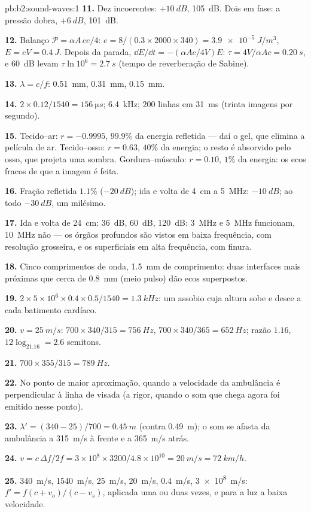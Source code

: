 \begin{solution}{pb:b2:sound-waves:1}
\textbf{11.} Dez incoerentes: $+\qty{10}{dB}$, \qty{105}{dB}. Dois em fase: a
pressão dobra, $+\qty{6}{dB}$, \qty{101}{dB}.

\textbf{12.} Balanço $\mathcal P = \alpha A\,ce/4$: $e = 8/(0.3 \times 2000 \times 340) =
\qty{3.9e-5}{J/m^3}$, $E = eV = \qty{0.4}{J}$. Depois da parada, $\dd E/\dd t = -(\alpha Ac
/4V)E$: $\tau = 4V/\alpha Ac = \qty{0.20}{s}$, e \qty{60}{dB} levam $\tau\ln10^6 =
\qty{2.7}{s}$ (tempo de reverberação de Sabine).

\textbf{13.} $\lambda = c/f$: \qty{0.51}{mm}, \qty{0.31}{mm}, \qty{0.15}{mm}.

\textbf{14.} $2 \times 0.12/1540 = \qty{156}{\micro s}$; \qty{6.4}{kHz}; $200$ linhas em
\qty{31}{ms} (trinta imagens por segundo).

\textbf{15.} Tecido--ar: $r = -0.9995$, $99.9\%$ da energia refletida
--- daí o gel, que elimina a película de ar. Tecido--osso: $r = 0.63$,
$40\%$ da energia; o resto é absorvido pelo osso, que projeta uma
sombra. Gordura--músculo: $r = 0.10$, $1\%$ da energia: os ecos fracos de que a
imagem é feita.

\textbf{16.} Fração refletida $1.1\%$ ($-\qty{20}{dB}$); ida e volta de
\qty{4}{cm} a \qty{5}{MHz}: $-\qty{10}{dB}$; ao todo $-\qty{30}{dB}$, um milésimo.

\textbf{17.} Ida e volta de \qty{24}{cm}: \qty{36}{dB}, \qty{60}{dB}, \qty{120}{dB}: \qty{3}{MHz}
e \qty{5}{MHz} funcionam, \qty{10}{MHz} não --- os órgãos profundos são vistos em
baixa frequência, com resolução grosseira, e os superficiais em alta
frequência, com finura.

\textbf{18.} Cinco comprimentos de onda, \qty{1.5}{mm} de comprimento: duas interfaces mais próximas
que cerca de \qty{0.8}{mm} (meio pulso) dão ecos superpostos.

\textbf{19.} $2 \times 5 \times 10^6 \times 0.4 \times 0.5/1540 = \qty{1.3}{kHz}$: um assobio cuja
altura sobe e desce a cada batimento cardíaco.

\textbf{20.} $v = \qty{25}{m/s}$: $700 \times 340/315 = \qty{756}{Hz}$, $700 \times 340/365 =
\qty{652}{Hz}$; razão $1.16$, $12\log_21.16 = 2.6$ semitons.

\textbf{21.} $700 \times 355/315 = \qty{789}{Hz}$.

\textbf{22.} No ponto de maior aproximação, quando a velocidade da ambulância é
perpendicular à linha de visada (a rigor, quando o som que chega
agora foi emitido nesse ponto).

\textbf{23.} $\lambda' = (340 - 25)/700 = \qty{0.45}{m}$ (contra \qty{0.49}{m}); o
som se afasta da ambulância a \qty{315}{m/s} à frente e a \qty{365}{m/s}
atrás.

\textbf{24.} $v = c\,\Delta f/2f = 3 \times 10^8 \times 3200/4.8 \times 10^{10} = \qty{20}{m/s} =
\qty{72}{km/h}$.

\textbf{25.} \qty{340}{m/s}, \qty{1540}{m/s}, \qty{25}{m/s}, \qty{20}{m/s}, \qty{0.4}{m/s},
\qty{3e8}{m/s}: $f' = f(c + v_o)/(c - v_s)$, aplicada uma ou duas vezes, e para a
luz a baixa velocidade.
\end{solution}
